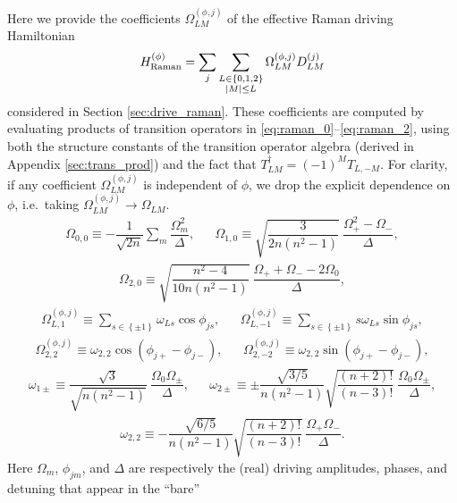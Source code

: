 \documentclass[nofootinbib,notitlepage,11pt]{revtex4-2}
\renewcommand{\t}{\text} %
\newcommand{\f}[2]{\dfrac{#1}{#2}} %
\newcommand{\p}[1]{\left(#1\right)} %
\renewcommand{\set}[1]{\left\{#1\right\}} %
\newcommand{\1}{\mathds{1}}
\begin{document}
Here we provide the coefficients $\Omega_{LM}^{(\phi,j)}$ of the
effective Raman driving Hamiltonian
\begin{align}
  H_{\t{Raman}}^{(\phi)}
  = \sum_j \sum_{\substack{L\in\set{0,1,2}\\\abs{M}\le L}}
  \Omega_{LM}^{(\phi,j)} D_{LM}^{(j)}
\end{align}
considered in Section \ref{sec:drive_raman}.  These coefficients are
computed by evaluating products of transition operators in
\eqref{eq:raman_0}--\eqref{eq:raman_2}, using both the structure
constants of the transition operator algebra (derived in Appendix
\ref{sec:trans_prod}) and the fact that
$T_{LM}^\dag = \p{-1}^M T_{L,-M}$.  For clarity, if any coefficient
$\Omega_{LM}^{(\phi,j)}$ is independent of $\phi$, we drop the
explicit dependence on $\phi$, i.e.~taking
$\Omega_{LM}^{(\phi,j)}\to\Omega_{LM}$.
\begin{align}
  \Omega_{0,0} \equiv -\f1{\sqrt{2n}} \sum_m\f{\Omega_m^2}{\Delta},
  &&
  \Omega_{1,0} \equiv \sqrt{\f{3}{2n\p{n^2-1}}}~
  \f{\Omega_+^2 - \Omega_-}{\Delta},
  \label{eq:O_01_0}
\end{align}
\begin{align}
  \Omega_{2,0} \equiv \sqrt{\f{n^2-4}{10n\p{n^2-1}}}~
  \f{\Omega_+ + \Omega_- - 2\Omega_0}{\Delta},
  \label{eq:O_2_0}
\end{align}
\begin{align}
  \Omega_{L,1}^{(\phi,j)}
  \equiv \sum_{s\in\set{\pm1}} \omega_{Ls} \cos\phi_{js},
  &&
  \Omega_{L,-1}^{(\phi,j)}
  \equiv \sum_{s\in\set{\pm1}} s \omega_{Ls} \sin\phi_{js},
\end{align}
\begin{align}
  \Omega_{2,2}^{(\phi,j)}
  \equiv \omega_{2,2} \cos\p{\phi_{j+}-\phi_{j-}},
  &&
  \Omega_{2,-2}^{(\phi,j)}
  \equiv \omega_{2,2} \sin\p{\phi_{j+}-\phi_{j-}},
\end{align}
\begin{align}
  \omega_{1\pm} \equiv \f{\sqrt3}{\sqrt{n\p{n^2-1}}}~
  \f{\Omega_0 \Omega_\pm}{\Delta},
  &&
  \omega_{2\pm} \equiv \pm \f{\sqrt{3/5}}{n\p{n^2-1}}
  \sqrt{\f{\p{n+2}!}{\p{n-3}!}}~ \f{\Omega_0\Omega_\pm}{\Delta},
\end{align}
\begin{align}
  \omega_{2,2} \equiv -\f{\sqrt{6/5}}{n\p{n^2-1}}
  \sqrt{\f{\p{n+2}!}{\p{n-3}!}}~ \f{\Omega_+\Omega_-}{\Delta}.
\end{align}
Here $\Omega_m$, $\phi_{jm}$, and $\Delta$ are respectively the (real)
driving amplitudes, phases, and detuning that appear in the ``bare''
\end{document}
